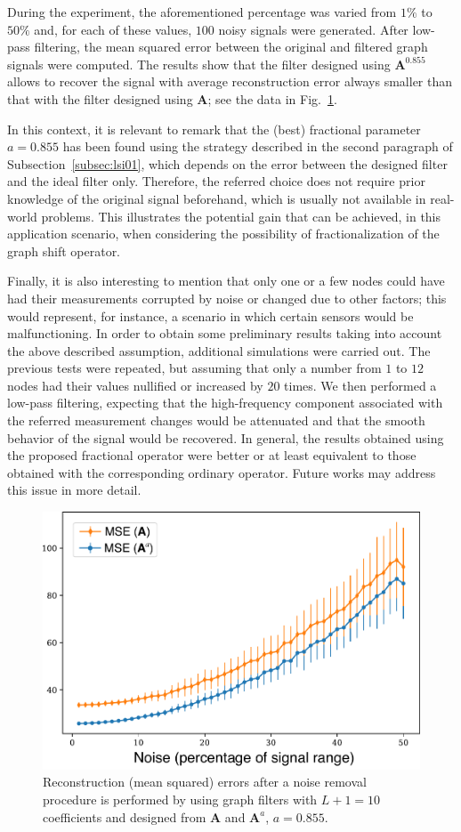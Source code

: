 During the experiment, the aforementioned percentage was varied from $1\%$ to $50\%$ and, for each of these values, $100$ noisy signals were generated. After low-pass filtering, the mean squared error between the original and filtered graph signals were computed. The results show that the filter designed using $\mathbf{A}^{0.855}$ allows to recover the signal with average reconstruction error always smaller than that with the filter designed using $\mathbf{A}$; see the data in Fig.~\ref{fig:usa05}.

{In this context, it is relevant to remark that the (best) fractional parameter $a=0.855$ has been found using the strategy described in the second paragraph of Subsection~\ref{subsec:lsi01}, which depends on the error between the designed filter and the ideal filter only. Therefore, the referred choice does not require prior knowledge of the original signal beforehand, which is usually not available in real-world problems.} This illustrates the potential gain that can be achieved, in this application scenario, when considering the possibility of fractionalization of the graph shift operator.

{Finally, it is also interesting to mention that only one or a few nodes could have had their measurements corrupted by noise or changed due to other factors; this would represent, for instance, a scenario in which certain sensors would be malfunctioning. In order to obtain some preliminary results taking into account the above described assumption, additional simulations were carried out. The previous tests were repeated, but assuming that only a number from $1$ to $12$ nodes had their values nullified or increased by $20$ times. We then performed a low-pass filtering, expecting that the high-frequency component associated with the referred measurement changes would be attenuated and that the smooth behavior of the signal would be recovered. In general, the results obtained using the proposed fractional operator were better or at least equivalent to those obtained with the corresponding ordinary operator. Future works may address this issue in more detail.}

\begin{figure}[t!]
	\centering
\includegraphics[width=0.7\linewidth]{Figures/ERROR_errobar_filtrados.pdf}
	\caption{Reconstruction (mean squared) errors after a noise removal procedure is performed by using graph filters with $L+1=10$ coefficients and designed from $\mathbf{A}$ and $\mathbf{A}^a$, $a=0.855$.}%
	\label{fig:usa05}%
	\vspace{-0.1cm}
\end{figure}

